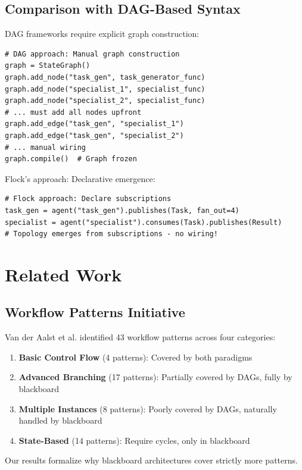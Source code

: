 \documentclass[11pt]{article}
\begin{document}
\subsection{Comparison with DAG-Based Syntax}

DAG frameworks require explicit graph construction:

\begin{verbatim}
# DAG approach: Manual graph construction
graph = StateGraph()
graph.add_node("task_gen", task_generator_func)
graph.add_node("specialist_1", specialist_func)
graph.add_node("specialist_2", specialist_func)
# ... must add all nodes upfront
graph.add_edge("task_gen", "specialist_1")
graph.add_edge("task_gen", "specialist_2")
# ... manual wiring
graph.compile()  # Graph frozen
\end{verbatim}

Flock's approach: Declarative emergence:

\begin{verbatim}
# Flock approach: Declare subscriptions
task_gen = agent("task_gen").publishes(Task, fan_out=4)
specialist = agent("specialist").consumes(Task).publishes(Result)
# Topology emerges from subscriptions - no wiring!
\end{verbatim}

\section{Related Work}

\subsection{Workflow Patterns Initiative}

Van der Aalst et al. \cite{vanderaalst2003workflow} identified 43 workflow patterns across four categories:
\begin{enumerate}
    \item \textbf{Basic Control Flow} (4 patterns): Covered by both paradigms
    \item \textbf{Advanced Branching} (17 patterns): Partially covered by DAGs, fully by blackboard
    \item \textbf{Multiple Instances} (8 patterns): Poorly covered by DAGs, naturally handled by blackboard
    \item \textbf{State-Based} (14 patterns): Require cycles, only in blackboard
\end{enumerate}

Our results formalize why blackboard architectures cover strictly more patterns.
\end{document}
